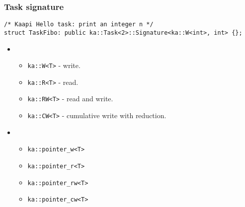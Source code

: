 \begin{frame}[fragile]
  \frametitle{Task signature}
\begin{minipage}[t]{\textwidth}
\begin{block}{}
\begin{lstlisting}
/* Kaapi Hello task: print an integer n */
struct TaskFibo: public ka::Task<2>::Signature<ka::W<int>, int> {};
\end{lstlisting}
\end{block}
\end{minipage}
%
  \begin{itemize}
  \item<2-> 
    \begin{itemize}
    \item \verb+ka::W<T>+ - write.
    \item \verb+ka::R<T>+ - read.
    \item \verb+ka::RW<T>+ - read and write.
    \item \verb+ka::CW<T>+ - cumulative write with reduction.
    \end{itemize}
  \item<3-> 
    \begin{itemize}
    \item \verb+ka::pointer_w<T>+
    \item \verb+ka::pointer_r<T>+
    \item \verb+ka::pointer_rw<T>+
    \item \verb+ka::pointer_cw<T>+
    \end{itemize}
  \end{itemize}
\end{frame}
